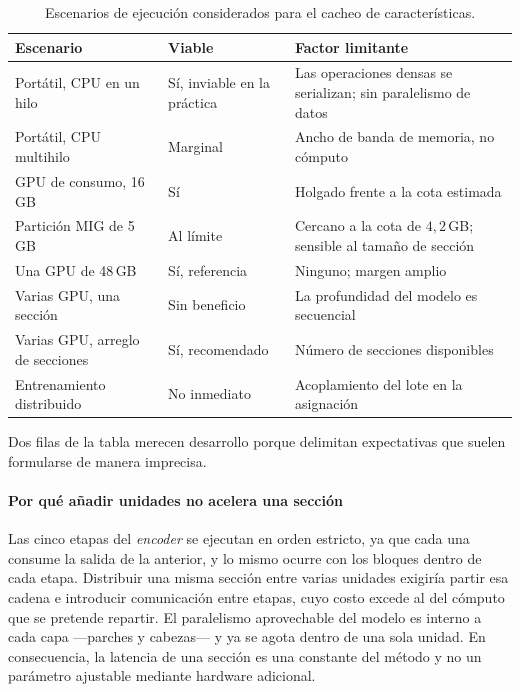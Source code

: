 \begin{table}[H]
\centering
\caption{Escenarios de ejecución considerados para el cacheo de características.}
\label{tab:escenarios}
\begin{tabular}{@{}p{3.5cm}p{2.2cm}p{5.6cm}@{}}
\toprule
\textbf{Escenario} & \textbf{Viable} & \textbf{Factor limitante} \\
\midrule
Portátil, CPU en un hilo & Sí, inviable en la práctica & Las operaciones densas se serializan; sin paralelismo de datos \\
Portátil, CPU multihilo & Marginal & Ancho de banda de memoria, no cómputo \\
GPU de consumo, 16\,GB & Sí & Holgado frente a la cota estimada \\
Partición MIG de 5\,GB & Al límite & Cercano a la cota de $4{,}2$\,GB; sensible al tamaño de sección \\
Una GPU de 48\,GB & Sí, referencia & Ninguno; margen amplio \\
Varias GPU, una sección & Sin beneficio & La profundidad del modelo es secuencial \\
Varias GPU, arreglo de secciones & Sí, recomendado & Número de secciones disponibles \\
Entrenamiento distribuido & No inmediato & Acoplamiento del lote en la asignación \\
\bottomrule
\end{tabular}
\end{table}

Dos filas de la tabla merecen desarrollo porque delimitan expectativas que
suelen formularse de manera imprecisa.

\paragraph*{Por qué añadir unidades no acelera una sección}
Las cinco etapas del \emph{encoder} se ejecutan en orden estricto, ya que cada
una consume la salida de la anterior, y lo mismo ocurre con los bloques dentro de
cada etapa. Distribuir una misma sección entre varias unidades exigiría partir
esa cadena e introducir comunicación entre etapas, cuyo costo excede al del
cómputo que se pretende repartir. El paralelismo aprovechable del modelo es
interno a cada capa ---parches y cabezas--- y ya se agota dentro de una sola
unidad. En consecuencia, la latencia de una sección es una constante del método
y no un parámetro ajustable mediante hardware adicional.

